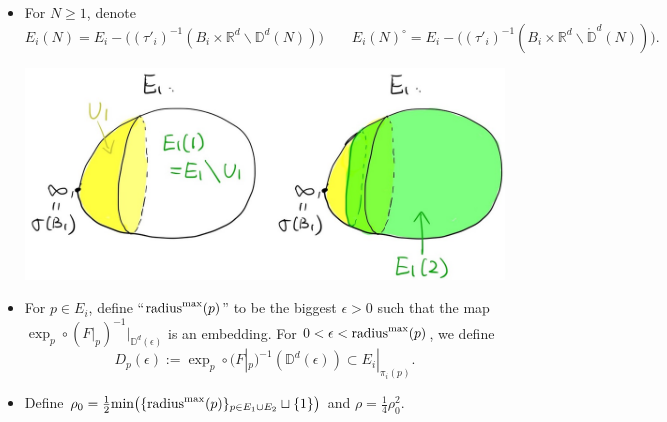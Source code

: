 \documentclass[11pt]{article}
\theoremstyle{definition}
\theoremstyle{remark}
\def\ov#1{\overline{#1}}
\def\mr#1{{\mathring{#1}}}
\def\R{\mathbb{R}}
\def\D{\mathbb{D}}
\def\tn#1{\textnormal{#1}}
\begin{document}
\begin{itemize}
\item For $N\ge1$, denote $$E_i(N)=E_i-\Big((\tau'_i)^{-1}(B_i\times\R^d\backslash\D^d(N))\Big)\qquad E_i(N)^{\circ}=E_i-\Big((\tau'_i)^{-1}(B_i\times\R^d\backslash\mr\D^d(N))\Big).$$

\includegraphics[scale=0.17]{fig1_fig}

\item For $p\in E_i$, define ``$\tn{radius}^{\max}(p)$'' to be the biggest $\epsilon>0$ such that the map 
$\exp_p\circ (F|_p)^{-1}\big|_{\D^d(\epsilon)}$
is an embedding. 
For $0<\epsilon<\tn{radius}^{\max}(p)$, we define \begin{equation}\label{Ddef_eqn}
D_p(\epsilon):=\exp_p\circ (F|_p)^{-1}(\D^d(\epsilon))\subset E_i|_{\pi_i(p)}.
\end{equation}

\item Define $\rho_0=\frac{1}{2}\tn{min}\big(\{\tn{radius}^{\max}(p)\}_{p\in E_1\cup E_2}\sqcup\{1\}\big)$ and $\rho=\frac{1}{4}\rho^2_0$. 
\end{itemize}

%
%
\end{document}
